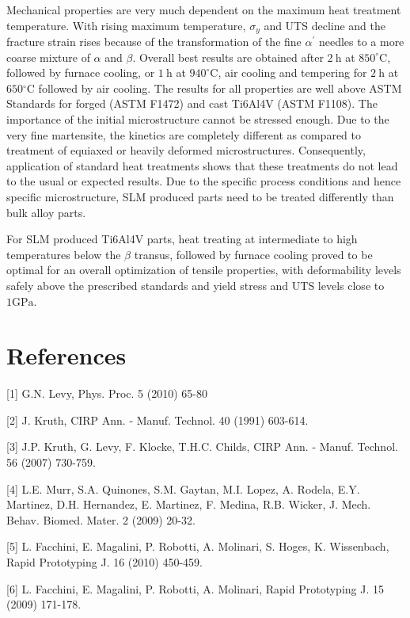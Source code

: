 \documentclass[10pt]{article}
\begin{document}
Mechanical properties are very much dependent on the maximum heat treatment temperature. With rising maximum temperature, $\sigma_{y}$ and UTS decline and the fracture strain rises because of the transformation of the fine $\alpha^{\prime}$ needles to a more coarse mixture of $\alpha$ and $\beta$. Overall best results are obtained after $2 \mathrm{~h}$ at $850^{\circ} \mathrm{C}$, followed by furnace cooling, or $1 \mathrm{~h}$ at $940^{\circ} \mathrm{C}$, air cooling and tempering for $2 \mathrm{~h}$ at $650{ }^{\circ} \mathrm{C}$ followed by air cooling. The results for all properties are well above ASTM Standards for forged (ASTM F1472) and cast Ti6Al4V (ASTM F1108). The importance of the initial microstructure cannot be stressed enough. Due to the very fine martensite, the kinetics are completely different as compared to treatment of equiaxed or heavily deformed microstructures. Consequently, application of standard heat treatments shows that these treatments do not lead to the usual or expected results. Due to the specific process conditions and hence specific microstructure, SLM produced parts need to be treated differently than bulk alloy parts.

For SLM produced Ti6Al4V parts, heat treating at intermediate to high temperatures below the $\beta$ transus, followed by furnace cooling proved to be optimal for an overall optimization of tensile properties, with deformability levels safely above the prescribed standards and yield stress and UTS levels close to $1 \mathrm{GPa}$.

\section*{References}
[1] G.N. Levy, Phys. Proc. 5 (2010) 65-80

[2] J. Kruth, CIRP Ann. - Manuf. Technol. 40 (1991) 603-614.

[3] J.P. Kruth, G. Levy, F. Klocke, T.H.C. Childs, CIRP Ann. - Manuf. Technol. 56 (2007) 730-759.

[4] L.E. Murr, S.A. Quinones, S.M. Gaytan, M.I. Lopez, A. Rodela, E.Y. Martinez, D.H. Hernandez, E. Martinez, F. Medina, R.B. Wicker, J. Mech. Behav. Biomed. Mater. 2 (2009) 20-32.

[5] L. Facchini, E. Magalini, P. Robotti, A. Molinari, S. Hoges, K. Wissenbach, Rapid Prototyping J. 16 (2010) 450-459.

[6] L. Facchini, E. Magalini, P. Robotti, A. Molinari, Rapid Prototyping J. 15 (2009) 171-178.
\end{document}
